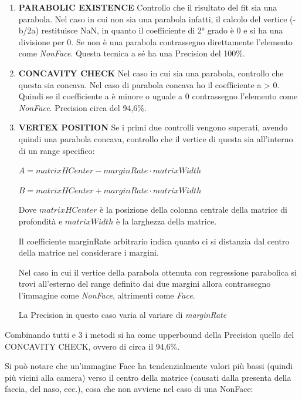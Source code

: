 \documentclass[
  italian,
]{article}
\begin{document}
\begin{enumerate}

\item
\textbf{PARABOLIC EXISTENCE}
\newline
Controllo che il risultato del fit sia una parabola. Nel caso in cui non sia una parabola infatti, il calcolo del vertice (-b/2a) restituisce NaN, in quanto il coefficiente di 2° grado è 0 e si ha una divisione per 0.
Se non è una parabola contrassegno direttamente l'elemento come \emph{NonFace}.
Questa tecnica a sé ha una Precision del 100\%.

\item
\textbf{CONCAVITY CHECK}
\newline
Nel caso in cui sia una parabola, controllo che questa sia concava.
Nel caso di parabola concava ho il coefficiente a > 0.
Quindi se il coefficiente a è minore o uguale a 0 contrassegno l'elemento come \emph{NonFace}.
\newline
Precision circa del 94,6\%.

\item
\textbf{VERTEX POSITION}
\newline
Se i primi due controlli vengono superati, avendo quindi una parabola concava, controllo che il vertice di questa sia all'interno di un range specifico:

\(A = matrixHCenter - marginRate \cdot matrixWidth\)

\(B = matrixHCenter + marginRate \cdot matrixWidth\)

Dove \(matrixHCenter\) è la posizione della colonna centrale della
matrice di profondità e \(matrixWidth\) è la larghezza della matrice.

Il coefficiente marginRate arbitrario indica quanto ci si distanzia
dal centro della matrice nel considerare i margini.

Nel caso in cui il vertice della parabola ottenuta con regressione
parabolica si trovi all'esterno del range definito dai due margini allora contrassegno l'immagine come \emph{NonFace}, altrimenti
come \emph{Face}.

La Precision in questo caso varia al variare di \emph{marginRate}
\end{enumerate}

Combinando tutti e 3 i metodi si ha come upperbound della Precision quello del CONCAVITY CHECK, ovvero di circa il 94,6\%.

\pagebreak

Si può notare che un'immagine Face ha tendenzialmente valori più bassi
(quindi più vicini alla camera) verso il centro della matrice (causati
dalla presenta della faccia, del naso, ecc.), cosa che non avviene nel caso di una NonFace:
\end{document}
